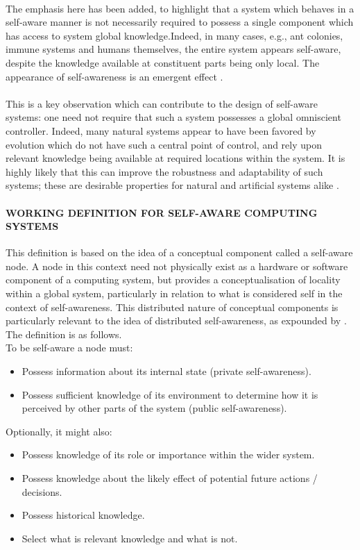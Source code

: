 \documentclass{article}
\begin{document}
		\paragraph{} The emphasis here has been added, to highlight that a system which behaves in a self-aware manner is not necessarily required to possess a single component which has access to system global knowledge.Indeed, in many cases, e.g., ant colonies, immune systems and humans themselves, the entire system appears self-aware, despite the knowledge available at constituent parts being only local. The appearance of self-awareness is an emergent effect \citet{mitchell-2005-self-awareness-and-control-in-decentralized-systems}.
		\paragraph{} This is a key observation which can contribute to the design of self-aware systems: one need not require that such a system possesses a global omniscient controller. Indeed, many natural systems appear to have been favored
		by evolution which do not have such a central point of control, and rely upon relevant knowledge being available
		at required locations within the system. It is highly likely that this can improve the robustness and adaptability of
		such systems; these are desirable properties for natural and artificial systems alike \citet{mitchell-2005-self-awareness-and-control-in-decentralized-systems}.
		\paragraph{WORKING DEFINITION FOR SELF-AWARE COMPUTING SYSTEMS}
		This definition is based on the idea of a conceptual component called a self-aware node. A node in this context need not physically exist as a hardware or software component of a computing system, but provides a conceptualisation of locality within a global system, particularly in relation to
		what is considered self in the context of self-awareness. This distributed nature of conceptual components is particularly relevant to the idea of distributed self-awareness, as expounded by \citet{mitchell-2005-self-awareness-and-control-in-decentralized-systems}. The definition is as follows.
		\\
		To be self-aware a node must:
		\begin{itemize}
			\item Possess information about its internal state
			(private self-awareness).
			\item Possess sufficient knowledge of its environment to determine how it is perceived by other
			parts of the system (public self-awareness).
		\end{itemize}
		Optionally, it might also:
		\begin{itemize}
			\item Possess knowledge of its role or importance
			within the wider system.
			\item Possess knowledge about the likely effect of
			potential future actions / decisions.
			\item Possess historical knowledge.
			\item Select what is relevant knowledge and what is
			not.
		\end{itemize}
\end{document}
